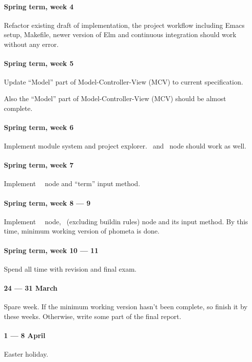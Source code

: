\documentclass[master.tex]{subfiles}
\begin{document}
\paragraph{Spring term, week 4} Refactor existing draft of implementation, the project workflow including Emacs setup, Makefile, newer version of Elm and continuous integration should work without any error.

\paragraph{Spring term, week 5} Update ``Model'' part of Model-Controller-View (MCV) to current specification.

Also the ``Model'' part of Model-Controller-View (MCV) should be almost complete.

\paragraph{Spring term, week 6} Implement module system and project explorer. \kOpen\ and \kComment\ node should work as well.

\paragraph{Spring term, week 7} Implement \kInductive\ \kGrammar\ node and ``term'' input method.

\paragraph{Spring term, week 8 --- 9} Implement \kInference\ \kRule\ node, \kTheorem\ (excluding buildin rules) node and its input method. By this time, minimum working version of phometa is done.

\paragraph{Spring term, week 10 --- 11} Spend all time with revision and final exam.

\paragraph{24 --- 31 March} Spare week. If the minimum working version hasn't been complete, so finish it by these weeks. Otherwise, write some part of the final report.

\paragraph{1 --- 8 April} Easter holiday.
\end{document}
